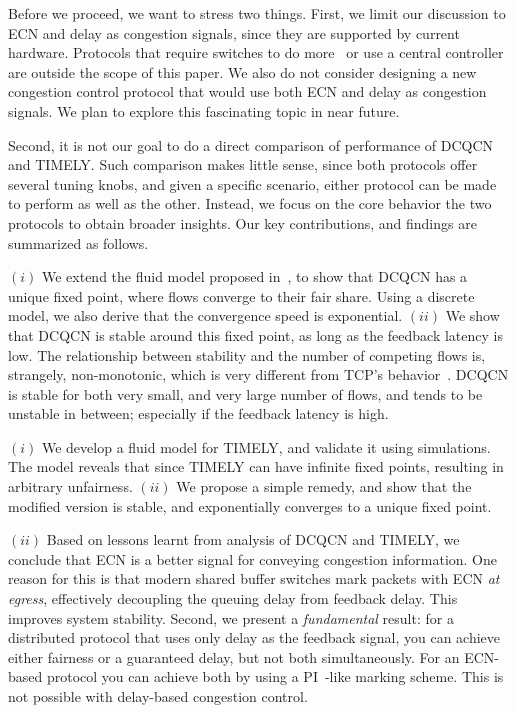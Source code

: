 Before we proceed, we want to stress two things.  First, we limit our discussion
to ECN and delay as congestion signals, since they are supported by current
hardware. Protocols that require switches to do
more~\cite{katabi2002congestion,rcp,pfabric} or use a central
controller~\cite{deadline,perry2014fastpass} are outside the scope of this
paper. We also do not consider designing a new congestion control protocol that
would use both ECN and delay as congestion signals. We plan to explore this
fascinating topic in near future.

Second, it is not our goal to do a direct comparison of performance of DCQCN and
TIMELY.  Such comparison makes little sense, since both protocols offer several
tuning knobs, and given a specific scenario, either protocol can be made to
perform as well as the other. Instead, we focus on the core behavior the two
protocols to obtain broader insights.  Our key contributions, and findings are
summarized as follows.

 $(i)$ We extend the fluid model proposed in~\cite{dcqcn}, to show
that DCQCN has a unique fixed point, where flows converge to their fair share.
Using a discrete model, we also derive that the convergence speed is exponential.
$(ii)$ We show that DCQCN is stable around this fixed point, as long as the
feedback latency is low. The relationship between stability and the number of
competing flows is, strangely, non-monotonic, which is very different from TCP's
behavior~\cite{misra:TAC2002}. DCQCN is stable for both very small, and very
large number of flows, and tends to be unstable in between; especially if the
feedback latency is high.

 $(i)$ We develop a fluid model for TIMELY, and validate it using
simulations. The model reveals that since TIMELY can have infinite fixed points,
resulting in arbitrary unfairness.  $(ii)$ We propose a simple remedy, and show
that the modified version is stable, and exponentially converges to a unique fixed 
point. 

 
$(ii)$ Based on lessons learnt from analysis of DCQCN and TIMELY,
we conclude that ECN is a better signal for conveying congestion information.
One reason for this is that modern shared buffer switches mark packets with ECN
{\em at egress}, effectively decoupling the queuing delay from feedback delay.
This improves system stability. Second, we present a \emph{fundamental} result:
for a distributed protocol that uses only delay as the feedback signal, you can
achieve either fairness or a guaranteed delay, but not both simultaneously. For
an ECN-based protocol you can achieve both by using a
PI~\cite{hollot2001designing}-like marking scheme. This is not possible with
delay-based congestion control. 

